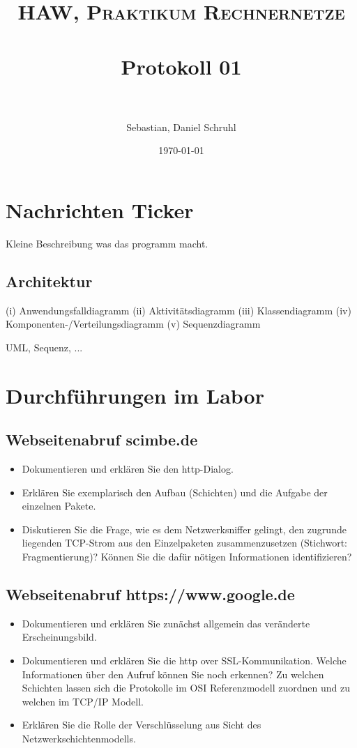 \documentclass[paper=a4, fontsize=11pt]{scrreprt}
\title{	
	\normalfont \normalsize 
	\textsc{HAW, Praktikum Rechnernetze} \\ [25pt] 
	\horrule{0.5pt} \\[0.4cm]
	\huge Protokoll 01 \\
	\horrule{2pt} \\[0.5cm]
}
\author{Sebastian, Daniel Schruhl}
\date{\normalsize\today}
\numberwithin{equation}{section}
\numberwithin{figure}{section}
\numberwithin{table}{section}
\begin{document}
\maketitle

\section{Nachrichten Ticker}

Kleine Beschreibung was das programm macht.

\subsection{Architektur}

(i) Anwendungsfalldiagramm
(ii) Aktivitätsdiagramm
(iii) Klassendiagramm
(iv) Komponenten-/Verteilungsdiagramm
(v) Sequenzdiagramm

UML, Sequenz, ...

\section{Durchführungen im Labor}

\subsection{Webseitenabruf scimbe.de}

\begin{itemize}
	\item Dokumentieren und erklären Sie den http-Dialog.
    \item Erklären Sie exemplarisch den Aufbau (Schichten) und die Aufgabe der einzelnen Pakete.
    \item Diskutieren Sie die Frage, wie es dem Netzwerksniffer gelingt, den zugrunde liegenden TCP-Strom aus den Einzelpaketen zusammenzusetzen (Stichwort: Fragmentierung)? Können Sie die dafür nötigen Informationen identifizieren?
\end{itemize}

\subsection{Webseitenabruf https://www.google.de}

\begin{itemize}
	\item Dokumentieren und erklären Sie zunächst allgemein das veränderte Erscheinungsbild.
	\item Dokumentieren und erklären Sie die http over SSL-Kommunikation. Welche Informationen über den
Aufruf können Sie noch erkennen? Zu welchen Schichten lassen sich die Protokolle im OSI
Referenzmodell zuordnen und zu welchen im TCP/IP Modell.
	\item Erklären Sie die Rolle der Verschlüsselung aus Sicht des Netzwerkschichtenmodells.
\end{itemize}
\end{document}
